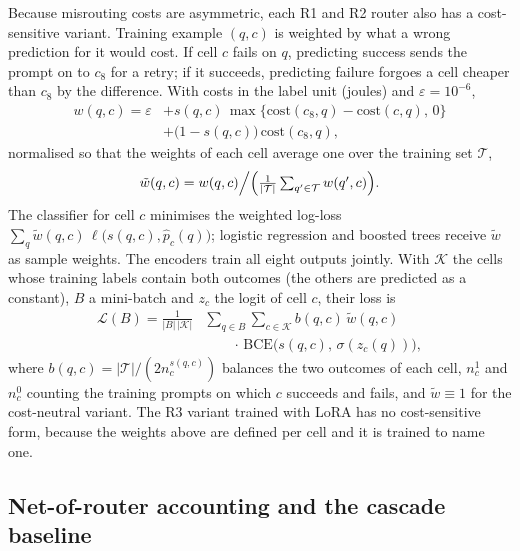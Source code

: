 \documentclass[final,5p,times,twocolumn]{elsarticle}
\theoremstyle{plain}
\newcommand{\cost}{\mathrm{cost}}
\begin{document}
Because misrouting costs are asymmetric, each R1 and R2 router also has a
cost-sensitive variant. Training example $(q, c)$ is weighted by what a wrong
prediction for it would cost. If cell $c$ fails on $q$, predicting success
sends the prompt on to $c_8$ for a retry; if it succeeds, predicting failure
forgoes a cell cheaper than $c_8$ by the difference. With costs in the label
unit (joules) and $\varepsilon = 10^{-6}$,
\begin{equation}
  \begin{split}
    w(q, c) = \varepsilon &+ s(q, c)\,\max\{\cost(c_8, q) - \cost(c, q),\, 0\}\\
    &+ \bigl(1 - s(q, c)\bigr)\,\cost(c_8, q),
  \end{split}
  \label{eq:csweight}
\end{equation}
normalised so that the weights of each cell average one over the training set
$\mathcal{T}$,
\begin{equation}
  \tilde{w}(q, c) = w(q, c) \Big/ \Bigl(\tfrac{1}{|\mathcal{T}|}
  \textstyle\sum_{q' \in \mathcal{T}} w(q', c)\Bigr).
  \label{eq:csnorm}
\end{equation}
The classifier for cell $c$ minimises the weighted log-loss
$\sum_{q} \tilde{w}(q, c)\, \ell\bigl(s(q, c), \hat{p}_c(q)\bigr)$; logistic
regression and boosted trees receive $\tilde{w}$ as sample weights. The
encoders train all eight outputs jointly. With $\mathcal{K}$ the cells whose
training labels contain both outcomes (the others are predicted as a
constant), $B$ a mini-batch and $z_c$ the logit of cell $c$, their loss is
\begin{equation}
  \begin{split}
    \mathcal{L}(B) = \frac{1}{|B|\,|\mathcal{K}|}
    &\sum_{q \in B} \sum_{c \in \mathcal{K}}
    b(q, c)\, \tilde{w}(q, c)\\
    &\qquad\cdot\,\mathrm{BCE}\bigl(s(q, c),\, \sigma(z_c(q))\bigr),
  \end{split}
  \label{eq:encloss}
\end{equation}
where $b(q, c) = |\mathcal{T}| / (2 n_{c}^{s(q,c)})$ balances the two outcomes
of each cell, $n_c^{1}$ and $n_c^{0}$ counting the training prompts on which
$c$ succeeds and fails, and $\tilde{w} \equiv 1$ for the cost-neutral variant.
The R3 variant trained with LoRA has no cost-sensitive form, because the
weights above are defined per cell and it is trained to name one.

\subsection{Net-of-router accounting and the cascade baseline}
\label{sec:net}
\end{document}
